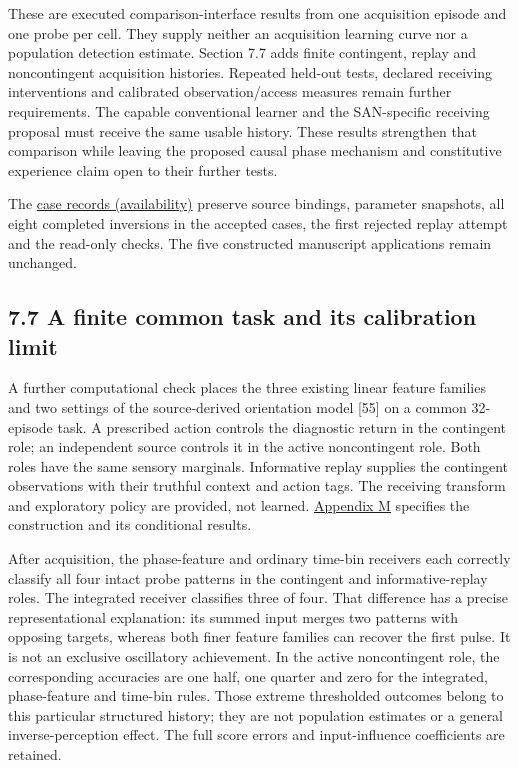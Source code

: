 \documentclass[
  american,
  11pt,
  letterpaper,
]{article}
\begin{document}
These are executed comparison-interface results from one acquisition episode and one probe per cell. They supply neither an acquisition learning curve nor a population detection estimate. Section 7.7 adds finite contingent, replay and noncontingent acquisition histories. Repeated held-out tests, declared receiving interventions and calibrated observation/access measures remain further requirements. The capable conventional learner and the SAN-specific receiving proposal must receive the same usable history. These results strengthen that comparison while leaving the proposed causal phase mechanism and constitutive experience claim open to their further tests.

The \href{https://github.com/v5ma/v5ma.github.io/blob/master/papers/companions/learning-to-feel-v1.0/ARTIFACT-AVAILABILITY.md\#artifact-40}{case records (availability)} preserve source bindings, parameter snapshots, all eight completed inversions in the accepted cases, the first rejected replay attempt and the read-only checks. The five constructed manuscript applications remain unchanged.

\subsection{7.7 A finite common task and its calibration limit}\label{a-finite-common-task-and-its-calibration-limit}

A further computational check places the three existing linear feature families and two settings of the source-derived orientation model {[}55{]} on a common 32-episode task. A prescribed action controls the diagnostic return in the contingent role; an independent source controls it in the active noncontingent role. Both roles have the same sensory marginals. Informative replay supplies the contingent observations with their truthful context and action tags. The receiving transform and exploratory policy are provided, not learned. \href{https://zenodo.org/records/23455801/files/Learning-to-Feel-Technical-Supplement-v1.1.pdf\#appendix-m}{Appendix M} specifies the construction and its conditional results.

After acquisition, the phase-feature and ordinary time-bin receivers each correctly classify all four intact probe patterns in the contingent and informative-replay roles. The integrated receiver classifies three of four. That difference has a precise representational explanation: its summed input merges two patterns with opposing targets, whereas both finer feature families can recover the first pulse. It is not an exclusive oscillatory achievement. In the active noncontingent role, the corresponding accuracies are one half, one quarter and zero for the integrated, phase-feature and time-bin rules. Those extreme thresholded outcomes belong to this particular structured history; they are not population estimates or a general inverse-perception effect. The full score errors and input-influence coefficients are retained.
\end{document}
